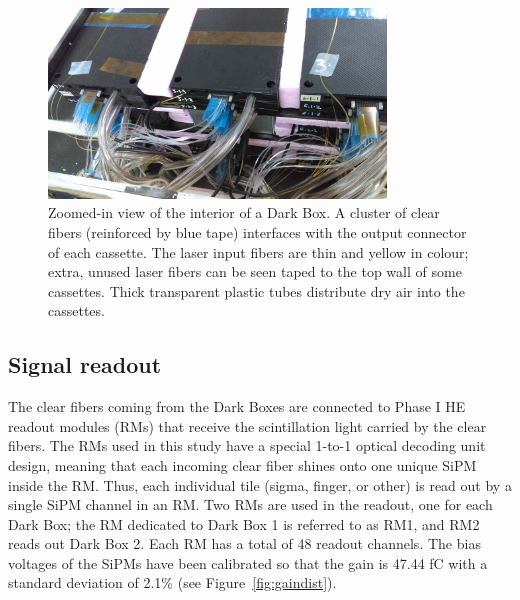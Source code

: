 \begin{figure}[hbtp]
\begin{center}
\includegraphics[width=0.8\textwidth]{figures/dark-box-2}
\caption{Zoomed-in view of the interior of a Dark Box. A cluster of clear fibers (reinforced by blue tape) interfaces with the output connector of each cassette. The laser input fibers are thin and yellow in colour; extra, unused laser fibers can be seen taped to the top wall of some cassettes. Thick transparent plastic tubes distribute dry air into the cassettes.}
\label{fig:dark-box-2}
\end{center}
\end{figure}

\subsection{Signal readout\label{sec:setup-readout}}
The clear fibers coming from the Dark Boxes are connected to Phase I HE readout modules (RMs) that receive the scintillation light carried by the clear fibers. The RMs used in this study have a special 1-to-1 optical decoding unit design, meaning that each incoming clear fiber shines onto one unique SiPM inside the RM. Thus, each individual tile (sigma, finger, or other) is read out by a single SiPM channel in an RM. Two RMs are used in the readout, one for each Dark Box; the RM dedicated to Dark Box 1 is referred to as RM1, and RM2 reads out Dark Box 2. Each RM has a total of 48 readout channels. The bias voltages of the SiPMs have been calibrated so that the gain is 47.44 fC with a standard deviation of 2.1\% (see Figure~\ref{fig:gaindist}).

